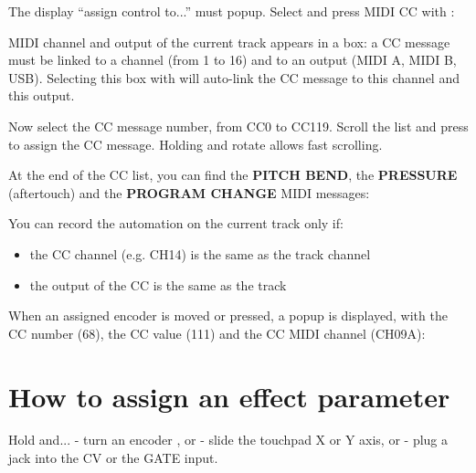 The display ``assign control to...'' must popup. Select and press MIDI CC with \encodericon{}:


MIDI channel and output of the current track appears in a box: a CC message must be linked to a channel (from 1 to 16) and to an output (MIDI A, MIDI B, USB). Selecting this box with \encodericon{} will auto-link the CC message to this channel and this output.


Now select the CC message number, from CC0 to CC119. Scroll the list and press \encodericon{} to assign the CC message. Holding  and rotate \encodericon{} allows fast scrolling.


At the end of the CC list, you can find the \textbf{PITCH BEND}, the \textbf{PRESSURE} (aftertouch) and the \textbf{PROGRAM CHANGE} MIDI messages:


You can record the automation on the current track only if:
\begin{itemize}
\item the CC channel (e.g. CH14) is the same as the track channel
\item the output of the CC is the same as the track
\end{itemize}


When an assigned encoder is moved or pressed, a popup is displayed, with the CC number (68), the CC value (111) and the CC MIDI channel (CH09A):


\section{How to assign an effect parameter}

Hold  and...
- turn an encoder \encodersicon{}, or
- slide the touchpad \touchpadicon{} X or Y axis, or
- plug a jack into the CV or the GATE input.


